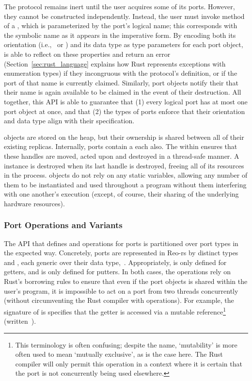 The protocol remains inert until the user acquires some of its ports. However, they cannot be constructed independently. Instead, the user must invoke  method of a , which is parameterized by the port's logical name; this corresponds with the symbolic name as it appears in the imperative form. By encoding both its orientation (i.e.,\  or ) and its data type as type parameters for each port object,  is able to reflect on these properties and return an error (Section~\ref{sec:rust_language} explains how Rust represents exceptions with enumeration types) if they incongruous with the protocol's definition, or if the port of that name is currently claimed. Similarly, port objects notify their  that their name is again available to be claimed in the event of their destruction. All together, this API is able to guarantee that (1) every logical port has at most one port object at once, and that (2) the types of ports enforce that their orientation and data type align with their specification.

 objects are stored on the heap, but their ownership is shared between all of their existing  replicas. Internally, ports contain a  each also. The  within ensures that these handles are moved, acted upon and destroyed in a thread-safe manner. A  instance is destroyed when its last handle is destroyed, freeing all of its resources in the process.  objects do not rely on any static variables, allowing any number of them to be instantiated and used throughout a program without them interfering with one another's execution (except, of course, their sharing of the underlying hardware resources). 

\subsubsection{Port Operations and Variants}
\label{sec:port_operations}
The API that defines  and  operations for ports is partitioned over port types in the expected way. Concretely, ports are represented in Reo-rs by distinct types  and , each generic over their data type,~. Appropriately,  is only defined for getters, and  is only defined for putters. In both cases, the operations rely on Rust's borrowing rules to ensure that even if the port objects is shared within the user's program, it is impossible to act on a port from two threads concurrently (without circumventing the Rust compiler with  operations). For example, the signature of  is specifies that the getter is accessed via a mutable reference\footnote{This terminology is often confusing; despite the name, `mutability' is more often used to mean `mutually exclusive', as is the case here. The Rust compiler will only permit this operation in a context where it is certain that the port is not concurrently being used elsewhere.} (written~).

